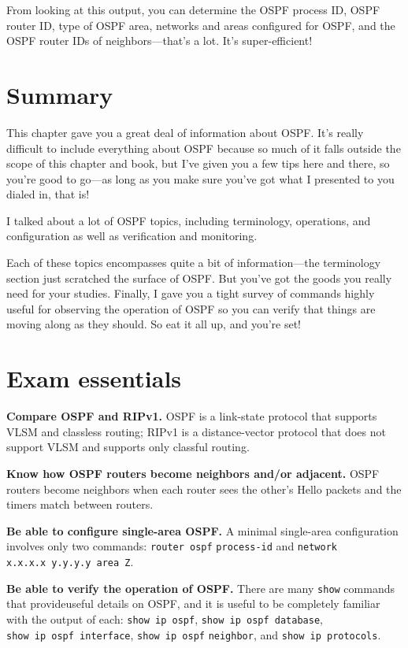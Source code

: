 From looking at this output, you can determine the OSPF process ID, OSPF
router ID, type of OSPF area, networks and areas configured for OSPF,
and the OSPF router IDs of neighbors---that's a lot. It's
super-efficient!



\section{Summary}

This chapter gave you a great deal of information about OSPF. It's
really difficult to include everything about OSPF because so much of it
falls outside the scope of this chapter and book, but I've given you a
few tips here and there, so you're good to go---as long as you make sure
you've got what I presented to you dialed in, that is!

I talked about a lot of OSPF topics, including terminology, operations,
and configuration as well as verification and monitoring.

Each of these topics encompasses quite a bit of information---the
terminology section just scratched the surface of OSPF. But you've got
the goods you really need for your studies. Finally, I gave you a tight
survey of commands highly useful for observing the operation of OSPF so
you can verify that things are moving along as they should. So eat it
all up, and you're set!



\section{Exam essentials}

\textbf{Compare OSPF and RIPv1.} OSPF is a link-state protocol that
supports VLSM and classless routing; RIPv1 is a distance-vector protocol
that does not support VLSM and supports only classful routing.

\textbf{Know how OSPF routers become neighbors and/or adjacent.} OSPF
routers become neighbors when each router sees the other's Hello packets
and the timers match between routers.

\protect\hypertarget{c18.xhtmlux5cux23Page_772}{}{}\textbf{Be able to
configure single-area OSPF.} A minimal single-area configuration
involves only two commands: \texttt{router\ ospf} \texttt{process-id}
and \texttt{network} \texttt{x.x.x.x\ y.y.y.y\ area\ Z}.

\textbf{Be able to verify the operation of OSPF.} There are many
\texttt{show} commands that provideuseful details on OSPF, and it is
useful to be completely familiar with the output of each:
\texttt{show\ ip\ ospf}, \texttt{show\ ip\ ospf\ database},
\texttt{show\ ip\ ospf\ interface}, \texttt{show\ ip\ ospf}
\texttt{neighbor}, and \texttt{show\ ip\ protocols}.



